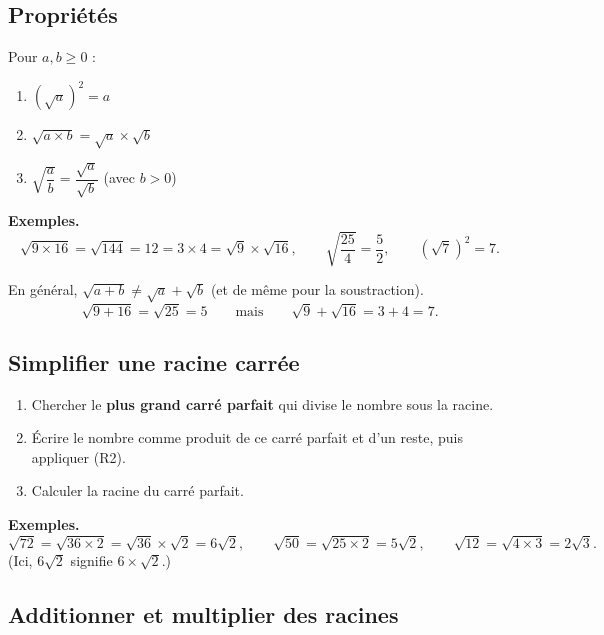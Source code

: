 \documentclass[../main.tex]{subfiles}
\begin{document}
\subsection{Propriétés}

Pour $a, b \geq 0$ :

\begin{propriete}
\begin{enumerate}[label=\textbf{(R\arabic*)}]
  \item $\left(\sqrt{a}\right)^2 = a$
  \item $\sqrt{a \times b} = \sqrt{a} \times \sqrt{b}$
  \item $\sqrt{\dfrac{a}{b}} = \dfrac{\sqrt{a}}{\sqrt{b}}$ \quad (avec $b > 0$)
\end{enumerate}
\end{propriete}

\textbf{Exemples.}
\[
\sqrt{9 \times 16} = \sqrt{144} = 12 = 3 \times 4 = \sqrt{9}\times\sqrt{16}, \qquad
\sqrt{\frac{25}{4}} = \frac{5}{2}, \qquad
\left(\sqrt{7}\right)^2 = 7.
\]

\begin{attention}
En général, $\sqrt{a+b} \neq \sqrt{a} + \sqrt{b}$ (et de même pour la soustraction).
\[
\sqrt{9+16} = \sqrt{25} = 5 \qquad\text{mais}\qquad \sqrt{9}+\sqrt{16} = 3+4 = 7.
\]
\end{attention}

\subsection{Simplifier une racine carrée}

\begin{methode}
\begin{enumerate}
  \item Chercher le \textbf{plus grand carré parfait} qui divise le nombre sous la racine.
  \item Écrire le nombre comme produit de ce carré parfait et d'un reste, puis appliquer (R2).
  \item Calculer la racine du carré parfait.
\end{enumerate}
\end{methode}

\textbf{Exemples.}
\[
\sqrt{72} = \sqrt{36 \times 2} = \sqrt{36}\times\sqrt{2} = 6\sqrt{2}, \qquad
\sqrt{50} = \sqrt{25\times 2} = 5\sqrt{2}, \qquad
\sqrt{12} = \sqrt{4 \times 3} = 2\sqrt{3}.
\]
(Ici, $6\sqrt{2}$ signifie $6 \times \sqrt{2}$.)

\subsection{Additionner et multiplier des racines}
\end{document}
